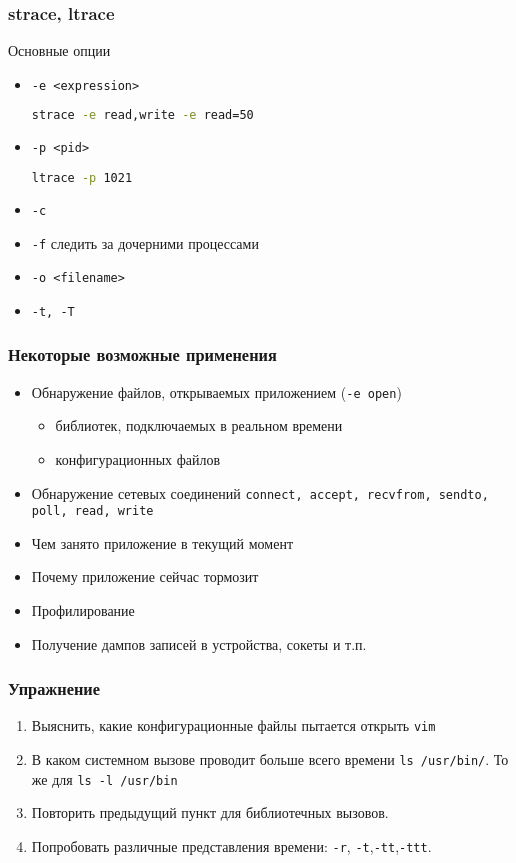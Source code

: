 \begin{frame}[fragile]
  \frametitle{strace, ltrace}
  \begin{center}
   Основные опции 
  \end{center}
  \begin{itemize}
   \item \texttt{-e <expression>}
\begin{lstlisting}[language=sh]
  strace -e read,write -e read=50 
\end{lstlisting}
   \item \texttt{-p <pid>}
\begin{lstlisting}[language=sh]
  ltrace -p 1021
\end{lstlisting}
   \item \texttt{-c}
   \item \texttt{-f} следить за дочерними процессами
   \item \texttt{-o <filename>}
   \item \texttt{-t, -T}
  \end{itemize}
\end{frame}

\begin{frame}
 \frametitle{Некоторые возможные применения}
 \begin{itemize}
  \item Обнаружение файлов, открываемых приложением (\texttt{-e open})
    \begin{itemize}
      \item библиотек, подключаемых в реальном времени
      \item конфигурационных файлов
    \end{itemize}
   \item Обнаружение сетевых соединений \texttt{connect, accept, recvfrom, sendto, poll, read, write} 
   \item Чем занято приложение в текущий момент
   \item Почему приложение сейчас тормозит
   \item Профилирование
   \item Получение дампов записей в устройства, сокеты и т.п.
 \end{itemize}
\end{frame}

\begin{frame}
 \frametitle{Упражнение}
 \begin{enumerate}
   \item Выяснить, какие конфигурационные файлы пытается открыть \texttt{vim}
   \item В каком системном вызове проводит больше всего времени \texttt{ls /usr/bin/}. То же для \texttt{ls -l /usr/bin}
   \item Повторить предыдущий пункт для библиотечных вызовов.
   \item Попробовать различные представления времени: {\tt -r}, {\tt -t},{\tt -tt},{\tt -ttt}.
 \end{enumerate}
\end{frame}


